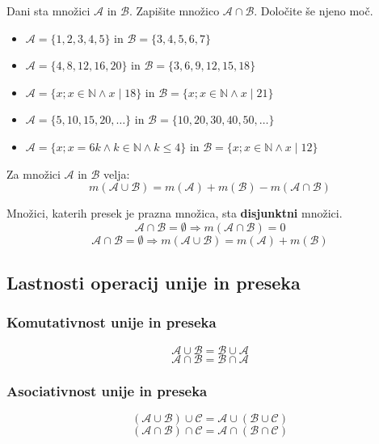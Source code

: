                 \begin{naloga}
                    Dani sta množici $\mathcal{A}$ in $\mathcal{B}$. Zapišite množico $\mathcal{A}\cap\mathcal{B}$.
                    Določite še njeno moč.
                    \begin{itemize}
                        \item $\mathcal{A}=\{1,2,3,4,5\}$ in $\mathcal{B}=\{3,4,5,6,7\}$
                        \item $\mathcal{A}=\{4,8,12,16,20\}$ in $\mathcal{B}=\{3,6,9,12,15,18\}$
                        \item $\mathcal{A}=\{x; x\in\mathbb{N} \land x\mid 18\}$ in $\mathcal{B}=\{x; x\in\mathbb{N} \land x\mid 21\}$
                        \item $\mathcal{A}=\{5,10,15,20,\dots\}$ in $\mathcal{B}=\{10, 20, 30, 40, 50, \dots\}$
                        \item $\mathcal{A}=\{x; x=6k \land k\in\mathbb{N} \land k\leq 4\}$ in $\mathcal{B}=\{x; x\in\mathbb{N} \land x\mid 12\}$
                    \end{itemize}
                \end{naloga}
        

    
        Za množici $\mathcal{A}$ in $\mathcal{B}$ velja:
        $$m(\mathcal{A}\cup\mathcal{B})=m(\mathcal{A})+m(\mathcal{B})-m(\mathcal{A}\cap\mathcal{B}) $$
    

    
        Množici, katerih presek je prazna množica, sta \textbf{disjunktni} množici.
        $$\mathcal{A}\cap\mathcal{B}=\emptyset\Rightarrow m(\mathcal{A}\cap\mathcal{B})=0 $$ 
        $$\mathcal{A}\cap\mathcal{B}=\emptyset\Rightarrow m(\mathcal{A}\cup\mathcal{B})=m(\mathcal{A})+m(\mathcal{B}) $$
    

    \subsection{Lastnosti operacij unije in preseka}
            \subsubsection{Komutativnost unije in preseka}
                $$ \mathcal{A}\cup\mathcal{B}=\mathcal{B}\cup\mathcal{A} $$
                $$ \mathcal{A}\cap\mathcal{B}=\mathcal{B}\cap\mathcal{A} $$
            

                \subsubsection{Asociativnost unije in preseka}
                $$ \left(\mathcal{A}\cup\mathcal{B}\right)\cup\mathcal{C}=\mathcal{A}\cup\left(\mathcal{B}\cup\mathcal{C}\right) $$
                $$ \left(\mathcal{A}\cap\mathcal{B}\right)\cap\mathcal{C}=\mathcal{A}\cap\left(\mathcal{B}\cap\mathcal{C}\right) $$


